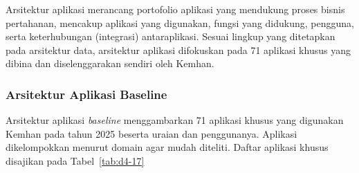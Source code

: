 Arsitektur aplikasi merancang portofolio aplikasi yang mendukung proses bisnis pertahanan, mencakup aplikasi yang digunakan, fungsi yang didukung, pengguna, serta keterhubungan (integrasi) antaraplikasi. Sesuai lingkup yang ditetapkan pada arsitektur data, arsitektur aplikasi difokuskan pada 71 aplikasi khusus yang dibina dan diselenggarakan sendiri oleh Kemhan.

\subsubsection{Arsitektur Aplikasi Baseline}

Arsitektur aplikasi \textit{baseline} menggambarkan 71 aplikasi khusus yang digunakan Kemhan pada tahun 2025 beserta uraian dan penggunanya. Aplikasi dikelompokkan menurut domain agar mudah diteliti. Daftar aplikasi khusus disajikan pada Tabel~\ref{tab:d4-17}

